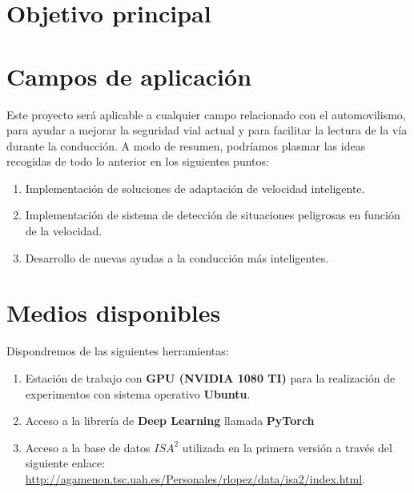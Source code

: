 \section{Objetivo principal}



\section{Campos de aplicación}


Este proyecto será aplicable a cualquier campo relacionado con el automovilismo, para ayudar a mejorar la seguridad vial actual y para facilitar la lectura de la vía durante la conducción. A modo de resumen, podríamos plasmar las ideas recogidas de todo lo anterior en los siguientes puntos:
\begin{enumerate}	
	\item Implementación de soluciones de adaptación de velocidad inteligente.
	\item Implementación de sistema de detección de situaciones peligrosas en función de la velocidad.
	\item Desarrollo de nuevas ayudas a la conducción más inteligentes.
\end{enumerate}

\section{Medios disponibles}

Dispondremos de las siguientes herramientas:

\begin{enumerate}
	\item Estación de trabajo con \textbf{GPU (NVIDIA 1080 TI)} para la realización de experimentos con sistema operativo \textbf{Ubuntu}.
	\item Acceso a la librería de \textbf{Deep Learning} llamada \textbf{PyTorch} \cite{pytorch}
	\item Acceso a la base de datos $ISA^2$ utilizada en la primera versión \cite{isa2} a través del siguiente enlace: \url{http://agamenon.tsc.uah.es/Personales/rlopez/data/isa2/index.html}.
\end{enumerate}

